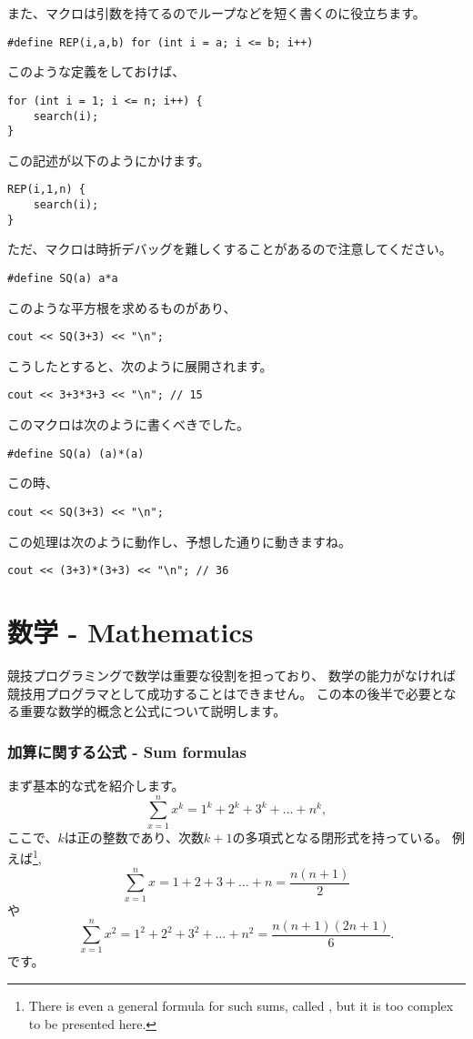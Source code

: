 また、マクロは引数を持てるのでループなどを短く書くのに役立ちます。

\begin{lstlisting}
#define REP(i,a,b) for (int i = a; i <= b; i++)
\end{lstlisting}
このような定義をしておけば、
\begin{lstlisting}
for (int i = 1; i <= n; i++) {
    search(i);
}
\end{lstlisting}
この記述が以下のようにかけます。
\begin{lstlisting}
REP(i,1,n) {
    search(i);
}
\end{lstlisting}

ただ、マクロは時折デバッグを難しくすることがあるので注意してください。
\begin{lstlisting}
#define SQ(a) a*a
\end{lstlisting}
このような平方根を求めるものがあり、
\begin{lstlisting}
cout << SQ(3+3) << "\n";
\end{lstlisting}
こうしたとすると、次のように展開されます。
\begin{lstlisting}
cout << 3+3*3+3 << "\n"; // 15
\end{lstlisting}

このマクロは次のように書くべきでした。
\begin{lstlisting}
#define SQ(a) (a)*(a)
\end{lstlisting}
この時、
\begin{lstlisting}
cout << SQ(3+3) << "\n";
\end{lstlisting}
この処理は次のように動作し、予想した通りに動きますね。
\begin{lstlisting}
cout << (3+3)*(3+3) << "\n"; // 36
\end{lstlisting}


\section{数学 - Mathematics}

競技プログラミングで数学は重要な役割を担っており、
数学の能力がなければ競技用プログラマとして成功することはできません。
この本の後半で必要となる重要な数学的概念と公式について説明します。

\subsubsection{加算に関する公式 - Sum formulas}

まず基本的な式を紹介します。
\[\sum_{x=1}^n x^k = 1^k+2^k+3^k+\ldots+n^k,\]
ここで、$k$は正の整数であり、次数$k + 1$の多項式となる閉形式を持っている。
例えば\footnote{
There is even a general formula for such sums, called ,
but it is too complex to be presented here.},
\[\sum_{x=1}^n x = 1+2+3+\ldots+n = \frac{n(n+1)}{2}\]
や
\[\sum_{x=1}^n x^2 = 1^2+2^2+3^2+\ldots+n^2 = \frac{n(n+1)(2n+1)}{6}.\]
です。

